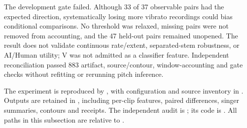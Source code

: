 The development gate failed. Although 33 of 37 observable pairs had the expected
direction, systematically losing more vibrato recordings could bias conditional
comparisons. No threshold was relaxed, missing pairs were not removed from
accounting, and the 47 held-out pairs remained unopened. The result does not
validate continuous rate/extent, separated-stem robustness, or AI/Human utility;
V was not admitted as a classifier feature. Independent reconciliation passed
883 artifact, source/contour, window-accounting and gate checks without refitting
or rerunning pitch inference.

The experiment is reproduced by
, with configuration and source
inventory in .
Outputs are retained in ,
including per-clip features, paired differences, singer summaries, contours and
receipts. The independent audit is
; its code is
. All paths in this subsection are
relative to .
